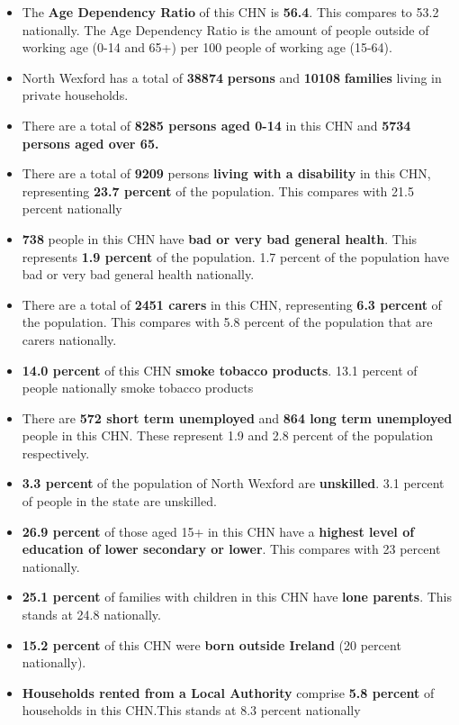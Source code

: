 \documentclass{article}
\begin{document}
\begin{itemize}

\item The \textbf{Age Dependency Ratio} of this CHN is  \textbf{56.4}. This compares to 53.2 nationally. The Age Dependency Ratio is the amount of people outside of working age (0-14 and 65+) per 100 people of working age (15-64). 

\item North Wexford has a total of \textbf{\num{38874}} \textbf{persons} and  \textbf{\num{10108}} \textbf{families} living in private households.

\item There are a total of \textbf{\num{8285} persons aged 0-14} in this CHN and \textbf{\num{5734} persons aged over 65.} 

\item There are a total of \textbf{\num{9209}} persons \textbf{living with a disability} in this CHN, representing \textbf{23.7 percent} of the population. This compares with  21.5 percent nationally

\item \textbf{\num{738}} people in this CHN have \textbf{bad or very bad general health}. This represents \textbf{1.9 percent} of the population. 1.7 percent of the population have bad or very bad general health nationally. 

\item There are a total of \textbf{\num{2451} carers} in this CHN, representing \textbf{6.3 percent} of the population. This compares with 5.8 percent of the population that are carers nationally. 

\item \textbf{14.0 percent} of this CHN \textbf{smoke tobacco products}. 13.1 percent of people nationally smoke tobacco products

\item There are \textbf{\num{572} short term unemployed} and \textbf{\num{864} long term unemployed} people in this CHN. These represent 1.9 and 2.8 percent of the population respectively.

\item  \textbf{3.3 percent} of the population of North Wexford are \textbf{unskilled}. 3.1 percent of people in the state are unskilled.

\item \textbf{26.9 percent} of those aged 15+ in this CHN have a \textbf{highest level of education of lower secondary or lower}. This compares with 23 percent nationally. 

\item \textbf{25.1 percent} of families with children in this CHN have \textbf{lone parents}. This stands at 24.8 nationally.

\item \textbf{15.2 percent} of this CHN were \textbf{born outside Ireland} (20 percent nationally).

\item \textbf{Households rented from a Local Authority} comprise \textbf{5.8 percent} of households in this CHN.This stands at 8.3 percent nationally

\end{itemize}
\end{document}
